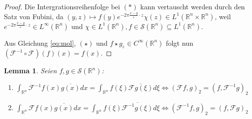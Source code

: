 \documentclass{article}
\newcommand{\R}[0]{\mathbb{R}}
\newcommand{\F}[0]{\mathcal{F}}
\newcommand{\Ssp}[0]{\mathcal{S}}
\newtheorem{lemma}{Lemma}
\begin{document}
\begin{proof}
    Die Intergrationsreihenfolge bei $(*)$ kann vertauscht werden durch den Satz von Fubini,
    da $(y, z) \mapsto f(y) e^{-2 \pi \frac{x - y}{\varepsilon} \cdot z}\chi(z) \in L^1(\R^n \times \R^n)$, weil $e^{-2 \pi \frac{x - y}{\varepsilon} \cdot z} \in L^{\infty}(\R^n)$ und $\chi \in L^1(\R^n),f \in \Ssp(\R^n) \subseteq L^1(\R^n)$.
    
    Aus Gleichung \ref{eq:mol}, $(\star)$ und $f \star g_{\varepsilon} \in C^{\infty}(\R^n)$ folgt nun $(\F^{-1} \circ \F)(f)(x) = f(x)$.
\end{proof}

\begin{lemma}\label{lem:Ssp1}
    Seien $f,g \in \Ssp(\R^n)$:
    \begin{enumerate}
        \item $\int_{\R^n}\F^{-1}f(x)\overline{g(x)}dx = \int_{\R^n}f(\xi)\overline{\F g(\xi)} d\xi \iff (\F f, g)_2 = (f, \F^{-1}g)_2$
        \item $\int_{\R^n}\F f(x)\overline{g(x)}dx = \int_{\R^n}f(\xi)\overline{\F^{-1} g(\xi)} d\xi \iff (\F^{-1} f, g)_2 = (f, \F g)_2$
    \end{enumerate}
\end{lemma}
\end{document}
